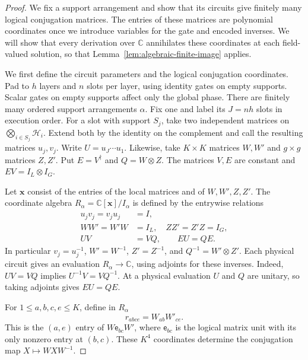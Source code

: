 \documentclass[aps,prl,reprint,notitlepage,nofootinbib,nobibnotes]{revtex4-2}
\newcommand{\HH}{\mathcal H}
\newcommand{\id}{I}
\begin{document}
\begin{proof}
We fix a support arrangement and show that its circuits give finitely
many logical conjugation matrices. The entries of these matrices are
polynomial coordinates once we introduce variables for the gate and
encoded inverses. We will show that every derivation over \(\mathbb C\)
annihilates these coordinates at each field-valued solution, so that
Lemma~\ref{lem:algebraic-finite-image} applies.

We first define the circuit parameters and the logical conjugation coordinates.
Pad to \(h\) layers and \(n\) slots per layer, using identity gates on
empty supports. Scalar gates on empty supports affect only the global
phase. There are finitely many ordered support arrangements \(\alpha\).
Fix one and label its \(J=nh\) slots in execution order. For a slot
with support \(S_j\), take two independent matrices on
\(\bigotimes_{i\in S_j}\HH_i\). Extend both by the identity on the
complement and call the resulting matrices \(u_j,v_j\). Write
\(U=u_J\cdots u_1\). Likewise, take \(K\times K\) matrices \(W,W'\)
and \(g\times g\) matrices \(Z,Z'\). Put \(E=V^\dagger\) and
\(Q=W\otimes Z\). The matrices \(V,E\) are constant and \(EV=\id_L\otimes\id_G\).

Let \(\mathbf x\) consist of the entries of the local matrices and
of \(W,W',Z,Z'\). The coordinate algebra \(R_\alpha=\mathbb C[\mathbf x]/I_\alpha\)
is defined by the entrywise relations
\begin{align}
 u_jv_j=v_ju_j&=\id,\nonumber\\
 WW'=W'W&=\id_L,\quad ZZ'=Z'Z=\id_G,\label{eq:algebraic-inverses}\\
 UV&=VQ,\qquad EU=QE.\label{eq:algebraic-encoding}
\end{align}
In particular \(v_j=u_j^{-1}\), \(W'=W^{-1}\), \(Z'=Z^{-1}\), and
\(Q^{-1}=W'\otimes Z'\). Each physical circuit gives an evaluation
\(R_\alpha\to\mathbb C\), using adjoints for these inverses. Indeed,
\(UV=VQ\) implies \(U^{-1}V=VQ^{-1}\). At a physical evaluation
\(U\) and \(Q\) are unitary, so taking adjoints gives \(EU=QE\).

For \(1\le a,b,c,e\le K\), define in \(R_\alpha\)
\begin{equation}\label{eq:conjugation-coordinates}
 r_{abce}=W_{ab}W'_{ce}.
\end{equation}
This is the \((a,e)\) entry of \(W\mathsf e_{bc}W'\), where
\(\mathsf e_{bc}\) is the logical matrix unit with its only nonzero
entry at \((b,c)\). These \(K^4\) coordinates determine the
conjugation map \(X\mapsto WXW^{-1}\).


\end{proof}
\end{document}
